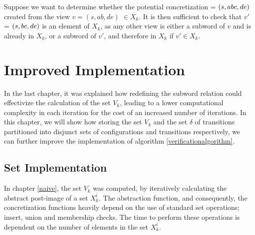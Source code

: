 \begin{exmp}
Suppose we want to determine whether the potential concretization  = $(s, abc, de)$ created from the view $v = (s, ab, de)$ $\in X_k$. It is then sufficient to check that $v'$ = $(s,bc,de)$ is an element of $X_k$, as any other view is either a subword of $v$ and is already in $X_k$, or a subword of $v'$, and therefore in $X_k$ if $v' \in X_k$.
\end{exmp}
\newpage
\newpage
\section{Improved Implementation}
In the last chapter, it was explained how redefining the subword relation could effectivize the calculation of the set $V_k$, leading to a lower computational complexity in each iteration for the cost of an increased number of iterations. In this chapter, we will show how storing the set $V_k$ and the set $\delta$ of transitions partitioned into disjunct sets of configurations and transitions respectively, we can further improve the implementation of algorithm \ref{verificationalgorithm}.



\subsection{Set Implementation}
In chapter \ref{naive}, the set $V_k$ was computed, by iteratively calculating the abstract post-image of a set $X_k^i$. The abstraction function, and consequently, the concretization functions heavily depend on the use of standard set operations; insert, union and membership checks. The time to perform these operations is dependent on the number of elements in the set $X_k^i$.

